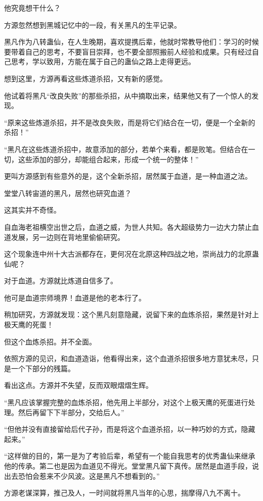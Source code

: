 \begin{this_body}
他究竟想干什么？

方源忽然想到黑城记忆中的一段，有关黑凡的生平记录。

黑凡作为八转蛊仙，在人生晚期，喜欢提携后辈，他就时常教导他们：学习的时候要带着自己的思考，不要盲目崇拜，也不要全部照搬前人经验和成果。只有经过自己思考，学以致用，方能在属于自己的蛊仙之路上走得更远。

想到这里，方源再看这些炼道杀招，又有新的感觉。

他试着将黑凡“改良失败”的那些杀招，从中摘取出来，结果他又有了一个惊人的发现。

“原来这些炼道杀招，并不是改良失败，而是将它们结合在一切，便是一个全新的杀招！”

“黑凡在这些炼道杀招中，故意添加的部分，若单个来看，都是败笔。但结合在一切，这些添加的部分，却能组合起来，形成一个统一的整体！”

更叫方源感到有些意外的是，这个全新杀招，居然属于血道，是一种血道之法。

堂堂八转宙道的黑凡，居然也研究血道？

这其实并不奇怪。

自血海老祖横空出世之后，血道之威，为世人共知。各大超级势力一边大力禁止血道发展，另一边则在背地里偷偷研究。

这个现象连中州十大古派都存在，更何况在北原这种四战之地，崇尚战力的北原蛊仙呢？

对于血道。方源就比炼道自信多了。

他可是血道宗师境界！血道是他的老本行了。

稍加研究，方源就发现：这个黑凡刻意隐藏，说留下来的血炼杀招，果然是针对上极天鹰的死蛋！

但这个血炼杀招。并不全面。

依照方源的见识，和血道造诣，他看得出来，这个血道杀招很多地方意犹未尽，只是一个下部分的残篇。

看出这点。方源并不失望，反而双眼熠熠生辉。

“黑凡应该掌握完整的血炼杀招，他先用上半部分，对这个上极天鹰的死蛋进行处理。然后再留下下半部分，交给后人。”

“但他并没有直接留给后代子孙，而是将这个血道杀招，以一种巧妙的方式，隐藏起来。”

“这样做的目的，第一是为了考验后辈，希望有一个能自我思考的优秀蛊仙来继承他的传承。第二也是因为血道见不得光。堂堂黑凡留下真传。居然是血道手段，说出去恐怕会惹来不少风波。这是黑凡不想看到的。”

方源老谋深算，推己及人，一时间就将黑凡当年的心思，揣摩得八九不离十。


\end{this_body}
